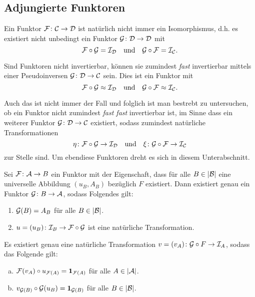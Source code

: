 \subsection{Adjungierte Funktoren}

Ein Funktor $\mathcal{F} \colon \mathcal{C} \to \mathcal{D}$ ist natürlich nicht immer ein Isomorphismus, d.h. es existiert nicht unbedingt ein Funktor $\mathcal{G} \colon \mathcal{D} \to \mathcal{D}$ mit
$$
\mathcal{F} \circ \mathcal{G} = \mathcal{I}_{\mathcal{D}} \quad\text{und}\quad \mathcal{G} \circ \mathcal{F} = \mathcal{I}_{\mathcal{C}}.
$$

Sind Funktoren nicht invertierbar, können sie zumindest \emph{fast} invertierbar mittels einer Pseudoinversen $\mathcal{G} \colon \mathcal{D} \to \mathcal{C}$ sein.
Dies ist ein Funktor mit 
$$\mathcal{F} \circ \mathcal{G} \approx \mathcal{I}_{\mathcal{D}} \quad\text{und}\quad \mathcal{G} \circ \mathcal{F} \approx \mathcal{I}_{\mathcal{C}}.$$

Auch das ist nicht immer der Fall und folglich ist man bestrebt zu untersuchen, ob ein Funktor nicht zumindest \emph{fast fast} invertierbar ist, im Sinne dass ein weiterer Funktor $\mathcal{G} \colon \mathcal{D} \to \mathcal{C}$ existiert, sodass zumindest natürliche Transformationen
$$
\eta \colon \mathcal{F} \circ \mathcal{G} \to \mathcal{I}_{\mathcal{D}} \quad\text{und}\quad \xi \colon \mathcal{G} \circ \mathcal{F} \to \mathcal{I}_{\mathcal{C}}
$$
zur Stelle sind.
Um ebendiese Funktoren dreht es sich in diesem Unterabschnitt.

\begin{thm}
  Sei $\mathcal{F} \colon \mathcal{A} \to B$ ein Funktor mit der Eigenschaft, dass für alle $B \in |\mathcal{B}|$ eine universelle Abbildung $(u_B, A_B)$ bezüglich $F$ existiert.
  Dann existiert genau ein Funktor $\mathcal{G} \colon B \to \mathcal{A}$, sodass Folgendes gilt:
  \begin{enumerate}[(1)]
    \item $\mathcal{G}(B) = A_B$ für alle $B \in |\mathcal{B}|$.
    \item $u = (u_B) \colon \mathcal{I}_B \to \mathcal{F} \circ \mathcal{G}$ ist eine natürliche Transformation.
  \end{enumerate}
\end{thm}

\begin{kor}
  Es existiert genau eine natürliche Transformation $v = (v_A) \colon \mathcal{G} \circ F \to \mathcal{I}_A$, sodass das Folgende gilt:
  \begin{enumerate}[(a)]
    \item $\mathcal{F}(v_A) \circ u_{\mathcal{F}(A)} = \mathbf{1}_{\mathcal{F}(A)}$ für alle $A \in |\mathcal{A}|$.
    \item $v_{\mathcal{G}(B)} \circ \mathcal{G}(u_B) = \mathbf{1}_{\mathcal{G}(B)}$ für alle $B \in |\mathcal{B}|$.
  \end{enumerate}
\end{kor}

